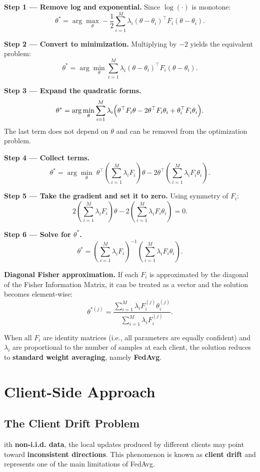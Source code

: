 \textbf{Step 1 — Remove log and exponential.}  
Since $\log(\cdot)$ is monotone:
\[
\theta^*
=
\arg\max_{\theta}
-
\frac{1}{2}
\sum_{i=1}^{M}
\lambda_i
(\theta - \theta_i)^\top
F_i
(\theta - \theta_i).
\]

\textbf{Step 2 — Convert to minimization.}  
Multiplying by $-2$ yields the equivalent problem:
\[
\theta^*
=
\arg\min_{\theta}
\sum_{i=1}^{M}
\lambda_i
(\theta - \theta_i)^\top
F_i
(\theta - \theta_i).
\]

\textbf{Step 3 — Expand the quadratic forms.}
\[
\theta^*
=
\arg\min_{\theta}
\sum_{i=1}^{M}
\lambda_i
\Bigl(
\theta^\top F_i \theta
-
2 \theta^\top F_i \theta_i
+
\theta_i^\top F_i \theta_i
\Bigr).
\]
The last term does not depend on $\theta$ and can be removed from the optimization
problem.

\textbf{Step 4 — Collect terms.}
\[
\theta^*
=
\arg\min_{\theta}
\;
\theta^\top
\left(
\sum_{i=1}^{M} \lambda_i F_i
\right)
\theta
-
2
\theta^\top
\left(
\sum_{i=1}^{M} \lambda_i F_i \theta_i
\right).
\]

\textbf{Step 5 — Take the gradient and set it to zero.}  
Using symmetry of $F_i$:
\[
2
\left(
\sum_{i=1}^{M} \lambda_i F_i
\right)
\theta
-
2
\left(
\sum_{i=1}^{M} \lambda_i F_i \theta_i
\right)
= 0.
\]

\textbf{Step 6 — Solve for $\theta^*$.}
\[
\theta^*
=
\left(
\sum_{i=1}^{M} \lambda_i F_i
\right)^{-1}
\left(
\sum_{i=1}^{M} \lambda_i F_i \theta_i
\right).
\]

\textbf{Diagonal Fisher approximation.}  
If each $F_i$ is approximated by the diagonal of the Fisher Information Matrix, it can be
treated as a vector and the solution becomes element-wise:
\[
\theta^{*(j)}
=
\frac{
\sum_{i=1}^{M}
\lambda_i F_i^{(j)} \theta_i^{(j)}
}{
\sum_{i=1}^{M}
\lambda_i F_i^{(j)}
}.
\]

When all $F_i$ are identity matrices (i.e., all parameters are equally confident) and
$\lambda_i$ are proportional to the number of samples at each client, the solution reduces
to \textbf{standard weight averaging}, namely \textbf{FedAvg}.

\section{Client-Side Approach}
\subsection{The Client Drift Problem}
ith \textbf{non-i.i.d. data}, the local updates produced by different
clients may point toward \textbf{inconsistent directions}. This phenomenon is known as
\textbf{client drift} and represents one of the main limitations of FedAvg.

